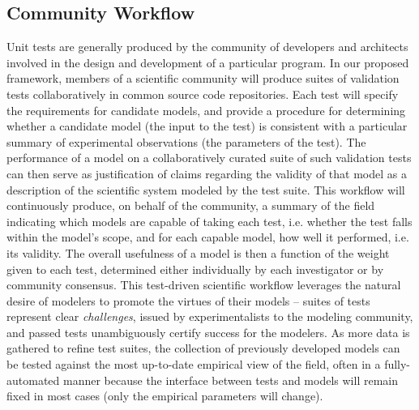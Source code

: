\documentclass[11pt,letterpaper]{article}
\begin{document}
\subsection{Community Workflow}
Unit tests are generally produced by the community of developers and architects involved in the design and development of a particular program. In our proposed framework, members of a scientific community will produce suites of validation tests collaboratively in common source code repositories. Each test will specify the requirements for candidate models, and provide a procedure for determining whether a candidate model (the input to the test) is consistent with a particular summary of experimental observations (the parameters of the test). The performance of a model on a collaboratively curated suite of such validation tests can then serve as justification of claims regarding the validity of that model as a description of the scientific system modeled by the test suite. This workflow will continuously produce, on behalf of the community, a summary of the field indicating which models are capable of taking each test, i.e. whether the test falls within the model's scope, and for each capable model, how well it performed, i.e. its validity.  The overall usefulness of a model is then a function of the weight given to each test, determined either individually by each investigator or by community consensus. This test-driven scientific workflow leverages the natural desire of modelers to promote the virtues of their models -- suites of tests represent clear \emph{challenges}, issued by experimentalists to the modeling community, and passed tests unambiguously certify success for the modelers. As more data is gathered to refine test suites, the collection of previously developed models can be tested against the most up-to-date empirical view of the field, often in a fully-automated manner because the interface between tests and models will remain fixed in most cases (only the empirical parameters will change).
\end{document}
